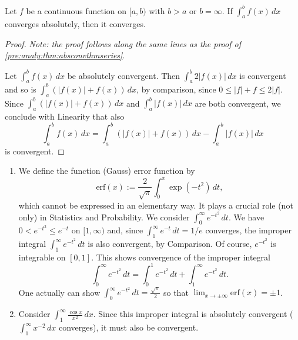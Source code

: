 \documentclass[10pt, a4paper]{article}
\begin{document}
\begin{theorem}
    Let $f$ be a continuous function on $[a, b)$ with $b > a$ or $b = \infty$.
    If $\int_{a}^{b}f(x)\,dx$ converges absolutely,
    then it converges.
    \begin{proof}
        \textit{Note: the proof follows along the same lines as the proof of \autoref{pre:analy:thm:absconvthmseries}}.

        Let $\int_{a}^{b}f(x)\,dx$ be absolutely convergent.
        Then $\int_{a}^{b}2|f(x)|\,dx$ is convergent and so is $\int_{a}^{b}(|f(x)| + f(x))\,dx$,
        by comparison,
        since $0 \leq |f| + f \leq 2|f|$.
        Since $\int_{a}^{b}(|f(x)| + f(x))\,dx$ and $\int_{a}^{b}|f(x)|\,dx$ are both convergent,
        we conclude with Linearity that also
        \[
        \int_{a}^{b}f(x)\,dx = \int_{a}^{b}(|f(x)| + f(x))\,dx - \int_{a}^{b}|f(x)|\,dx
        \]
        is convergent.
    \end{proof}
\end{theorem}

\begin{enumerate}[label = (\alph*)]
    \item We define the function
    (Gauss)
    error function by
    \[
    \mathrm{erf}(x) := \frac{2}{\sqrt{\pi}}\int_{0}^{x}\exp(-t ^ 2)\,dt,
    \]
    which cannot be expressed in an elementary way.
    It plays a crucial role
    (not only)
    in Statistics and Probability.
    We consider $\int_{0}^{\infty}e ^ {-t ^ 2}\,dt$.
    We have $0 < e ^ {-t ^ 2} \leq e ^ {-t}$ on $[1, \infty)$ and,
    since $\int_{1}^{\infty}e ^ {-t}\,dt = 1 / e$ converges,
    the improper integral $\int_{1}^{\infty}e ^ {-t ^ 2}\,dt$ is also convergent,
    by Comparison.
    Of course,
    $e ^ {-t ^ 2}$ is integrable on $[0, 1]$.
    This shows convergence of the improper integral
    \[
    \int_{0}^{\infty}e ^ {-t ^ 2}\,dt = \int_{0}^{1}e ^ {-t ^ 2}\,dt + \int_{1}^{\infty}e ^ {-t ^ 2}\,dt.
    \]
    One actually can show $\int_{0}^{\infty}e ^ {-t ^ 2}\,dt = \frac{\sqrt{\pi}}{2}$ so that $\lim_{x \rightarrow \pm\infty}\mathrm{erf}(x) = \pm 1$.

    \item Consider $\displaystyle\int_{1}^{\infty}\frac{\cos{x}}{x ^ 2}\,dx$.
    Since this improper integral is absolutely convergent
    ($\int_{1}^{\infty}x ^ {-2}\,dx$ converges),
    it must also be convergent.
\end{enumerate}
\end{document}
